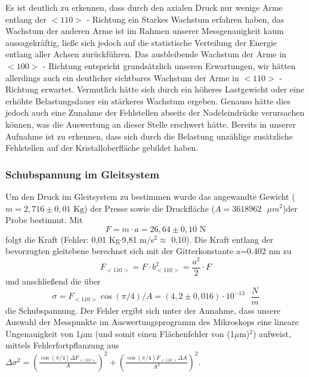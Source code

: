             Es ist deutlich zu erkennen, dass durch den axialen Druck nur wenige Arme entlang der $<110>$ - Richtung ein Starkes Wachstum erfahren haben, das Wachstum der anderen Arme ist im Rahmen unserer
            Messgenauigkeit kaum aussagekräftig, ließe sich jedoch auf die statistische Verteilung der Energie entlang aller Achsen zurückführen.
		Das ausbleibende Wachstum der Arme in $<100>$ - Richtung entspricht grundsätzlich unseren Erwartungen, wir hätten allerdings auch ein deutlicher sichtbares Wachstum der Arme in $<110>$ - Richtung erwartet.
		Vermutlich hätte sich durch ein höheres Lastgewicht oder eine erhöhte Belastungsdauer ein stärkeres Wachstum ergeben. Genauso hätte dies jedoch auch eine Zunahme der Fehlstellen abseits der Nadeleindrücke
		verursachen können, was die Auswertung an dieser Stelle erschwert hätte. Bereits in unserer Aufnahme ist zu erkennen, dass sich durch die Belastung unzählige zusätzliche Fehlstellen auf der Kristalloberfläche
		gebildet haben.
        \subsubsection*{Schubspannung im Gleitsystem}
            Um den Druck im Gleitsystem zu bestimmen wurde das angewandte Gewicht ($m = 2,716\pm0,01\text{ Kg}$) der Presse sowie die Druckfläche ($A=3618962\text{ }\mu m^2$)der Probe bestimmt.
            Mit
            \begin{equation}
                F = m \cdot a = 26,64\pm0,10\text{ N}
            \end{equation}
            folgt die Kraft (Fehler: 0,01 Kg$\cdot$9,81 m/s$^2 \approx$ 0,10). Die Kraft entlang der bevorzugten 
            gleitebene berechnet sich mit der Gitterkonstante a=0.402 nm zu\cite{7} 
            \begin{equation}
                F_{<110>} = F\cdot b_{<110>}^2 = \frac{a^2}{2} \cdot F 
            \end{equation}
            und anschließend die über
            \begin{equation}
                \sigma = F_{<110>} \cos{(\pi / 4)}/ A = (4,2 \pm 0,016)\cdot 10^{-13}\text{ }\frac{N}{m}
            \end{equation}
            die Schubspannung. Der Fehler ergibt sich unter der Annahme, dass unsere Auswahl der Messpunkte im Auswertungsprogramm des Mikroskops eine lineare Ungenauigkeit von 1$\mu$m (und somit einen Flächenfehler von (1$\mu$m)$^2$) aufweist, mittels Fehlerfortpflanzung aus $\Delta \sigma^2 = (\frac{\cos{(\pi / 4)} \Delta F_{<110>}}{A})^2 + ( \frac{\cos{(\pi / 4)} F_{<110>} \Delta A}{A^2})^2$.